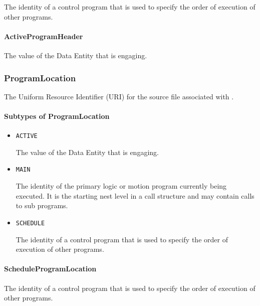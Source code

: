 The identity of a control program that is used to specify the order of execution of other programs.


\paragraph{ActiveProgramHeader}\mbox{}
\label{sec:ActiveProgramHeader}


The value of the \gls{Data Entity} that is engaging.


\subsubsection{ProgramLocation}
\label{sec:ProgramLocation}



The Uniform Resource Identifier (URI) for the source file associated with .


\paragraph{Subtypes of ProgramLocation}\mbox{}
\label{sec:Subtypes of ProgramLocation}

\begin{itemize}

\item \texttt{ACTIVE}


The value of the \gls{Data Entity} that is engaging.

\item \texttt{MAIN}


The identity of the primary logic or motion program currently being executed. It is the starting nest level in a call structure and may contain calls to sub programs.

\item \texttt{SCHEDULE}


The identity of a control program that is used to specify the order of execution of other programs.


\end{itemize}

\paragraph{ScheduleProgramLocation}\mbox{}
\label{sec:ScheduleProgramLocation}


The identity of a control program that is used to specify the order of execution of other programs.


